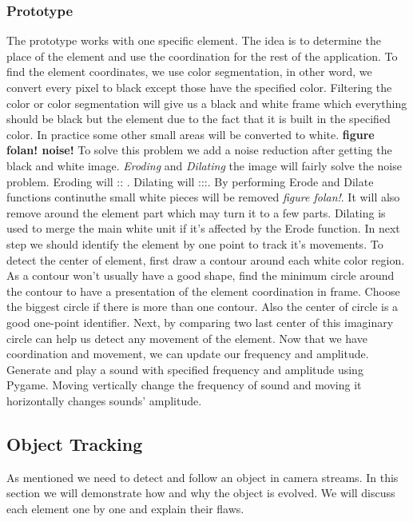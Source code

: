\documentclass{report}
\begin{document}
\subsubsection{Prototype}
The prototype works with one specific element. The idea is to determine the place of the element and use the coordination for the rest of the application. To find the element coordinates, we use color segmentation, in other word, we convert every pixel to black except those have the specified color. Filtering the color or color segmentation will give us a black and white frame which everything should be black but the element due to the fact that it is built in the specified color. In practice some other small areas will be converted to white. \textbf{figure folan! noise!} To solve this problem we add a noise reduction after getting the black and white image. \textit{Eroding} and \textit{Dilating} the image will fairly solve the noise problem. Eroding will :: . Dilating will :::. By performing Erode and Dilate functions continuthe small white pieces will be removed \textit{figure folan!}. It will also remove around the element part which may turn it to a few parts. Dilating is used to merge the main white unit if it's affected by the Erode function. In next step we should identify the element by one point to track it's movements. To detect the center of element, first draw a contour around each white color region. As a contour won't usually have a good shape, find the minimum circle around the contour to have a presentation of the element coordination in frame. Choose the biggest circle if there is more than one contour. Also the center of circle is a good one-point identifier. \newline
Next, by comparing two last center of this imaginary circle can help us detect any movement of the element. Now that we have coordination and movement, we can update our frequency and amplitude. Generate and play a sound with specified frequency and amplitude using Pygame. Moving vertically change the frequency of sound and moving it horizontally changes sounds' amplitude.  \newline

\subsection{Object Tracking}
As mentioned we need to detect and follow an object in camera streams. In this section we will demonstrate how and why the object is evolved. We will discuss each element one by one and explain their flaws.
\end{document}
